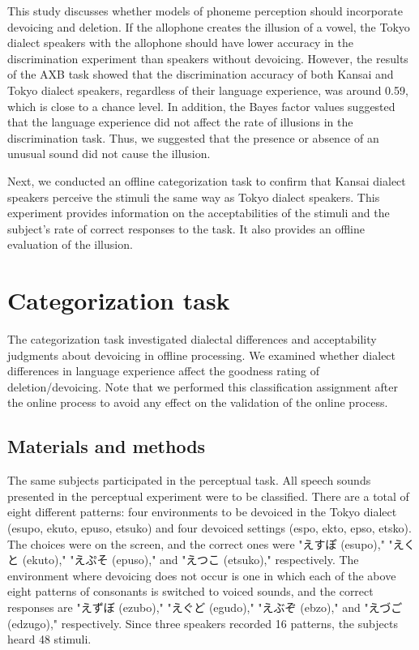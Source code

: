 \documentclass[a4paper,11pt,twocolumn]{article}
\begin{document}
This study discusses whether models of phoneme perception should incorporate devoicing and deletion. If the allophone creates the illusion of a vowel, the Tokyo dialect speakers with the allophone should have lower accuracy in the discrimination experiment than speakers without devoicing. However, the results of the AXB task showed that the discrimination accuracy of both Kansai and Tokyo dialect speakers, regardless of their language experience, was around 0.59, which is close to a chance level. In addition, the Bayes factor values suggested that the language experience did not affect the rate of illusions in the discrimination task. Thus, we suggested that the presence or absence of an unusual sound did not cause the illusion.

Next, we conducted an offline categorization task to confirm that Kansai dialect speakers perceive the stimuli the same way as Tokyo dialect speakers. This experiment provides information on the acceptabilities of the stimuli and the subject's rate of correct responses to the task. It also provides an offline evaluation of the illusion.


\section{Categorization task}

The categorization task investigated dialectal differences and acceptability judgments about devoicing in offline processing. We examined whether dialect differences in language experience affect the goodness rating of deletion/devoicing. Note that we performed this classification assignment after the online process to avoid any effect on the validation of the online process.

\subsection{Materials and methods}

The same subjects participated in the perceptual task. All speech sounds presented in the perceptual experiment were to be classified. There are a total of eight different patterns: four environments to be devoiced in the Tokyo dialect (esupo, ekuto, epuso, etsuko) and four devoiced settings (espo, ekto, epso, etsko). The choices were on the screen, and the correct ones were "えすぽ (esupo)," "えくと (ekuto)," "えぷそ (epuso)," and "えつこ (etsuko)," respectively. The environment where devoicing does not occur is one in which each of the above eight patterns of consonants is switched to voiced sounds, and the correct responses are "えずぼ (ezubo)," "えぐど (egudo)," "えぶぞ (ebzo)," and "えづご (edzugo)," respectively. Since three speakers recorded 16 patterns, the subjects heard 48 stimuli.
\end{document}
